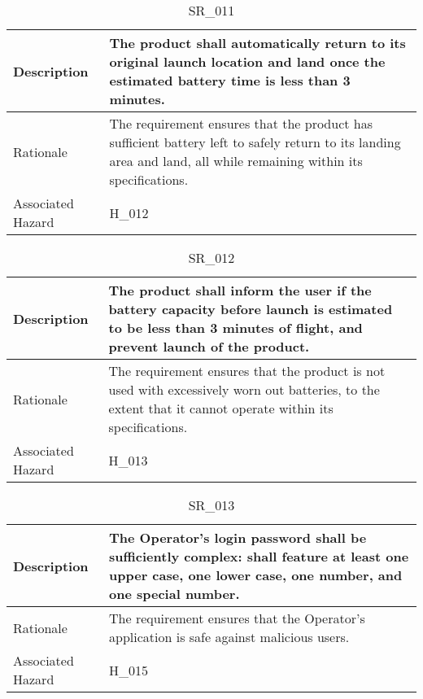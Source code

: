 \documentclass{article}
\begin{document}
\begin{table}[!h]
\begin{center}
\caption {SR\_011} 
\label{SR_011}
\begin{tabular}{ | m{3cm} | m{11cm} | }
\hline
Description & The product shall automatically return to its original launch location and land once the estimated battery time is less than 3 minutes. \\
\hline
Rationale & The requirement ensures that the product has sufficient battery left to safely return to its landing area and land, all while remaining within its specifications. \\
\hline
Associated Hazard & H\_012 \\
\hline
\end{tabular}
\end{center}
\end{table}

\begin{table}[!h]
\begin{center}
\caption {SR\_012} 
\label{SR_012}
\begin{tabular}{ | m{3cm} | m{11cm} | }
\hline
Description & The product shall inform the user if the battery capacity before launch is estimated to be less than 3 minutes of flight, and prevent launch of the product. \\
\hline
Rationale & The requirement ensures that the product is not used with excessively worn out batteries, to the extent that it cannot operate within its specifications. \\
\hline
Associated Hazard & H\_013 \\
\hline
\end{tabular}
\end{center}
\end{table}

\begin{table}[!h]
\begin{center}
\caption {SR\_013} 
\label{SR_013}
\begin{tabular}{ | m{3cm} | m{11cm} | }
\hline
Description & The Operator's login password shall be sufficiently complex: shall feature at least one upper case, one lower case, one number, and one special number. \\
\hline
Rationale & The requirement ensures that the Operator's application is safe against malicious users. \\
\hline
Associated Hazard & H\_015 \\
\hline
\end{tabular}
\end{center}
\end{table}
\end{document}
